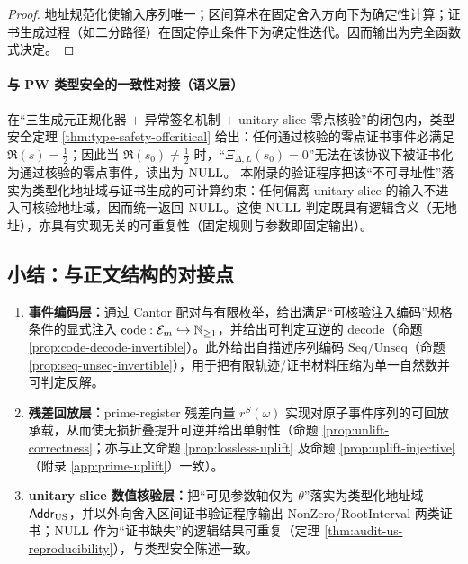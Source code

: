 \begin{proof}
地址规范化使输入序列唯一；区间算术在固定舍入方向下为确定性计算；证书生成过程（如二分路径）在固定停止条件下为确定性迭代。因而输出为完全函数式决定。
\end{proof}

\paragraph{与 PW 类型安全的一致性对接（语义层）}
在“三生成元正规化器 $+$ 异常签名机制 $+$ unitary slice 零点核验”的闭包内，类型安全定理 \ref{thm:type-safety-offcritical} 给出：任何通过核验的零点证书事件必满足 $\Re(s)=\tfrac12$；因此当 $\Re(s_0)\neq \tfrac12$ 时，“$\Xi_{\Delta,L}(s_0)=0$”无法在该协议下被证书化为通过核验的零点事件，读出为 $\mathrm{NULL}$。
本附录的验证程序把该“不可寻址性”落实为类型化地址域与证书生成的可计算约束：任何偏离 unitary slice 的输入不进入可核验地址域，因而统一返回 $\mathrm{NULL}$。这使 $\mathrm{NULL}$ 判定既具有逻辑含义（无地址），亦具有实现无关的可重复性（固定规则与参数即固定输出）。

\subsection{小结：与正文结构的对接点}
\begin{enumerate}
  \item \textbf{事件编码层：}通过 Cantor 配对与有限枚举，给出满足“可核验注入编码”规格条件的显式注入 $\mathrm{code}:\mathcal E_m\hookrightarrow\mathbb{N}_{\ge 1}$，并给出可判定互逆的 $\mathrm{decode}$（命题 \ref{prop:code-decode-invertible}）。此外给出自描述序列编码 $\mathrm{Seq}/\mathrm{Unseq}$（命题 \ref{prop:seq-unseq-invertible}），用于把有限轨迹/证书材料压缩为单一自然数并可判定反解。
  \item \textbf{残差回放层：}prime-register 残差向量 $r^S(\omega)$ 实现对原子事件序列的可回放承载，从而使无损折叠提升可逆并给出单射性（命题 \ref{prop:unlift-correctness}；亦与正文命题 \ref{prop:lossless-uplift} 及命题 \ref{prop:uplift-injective}（附录 \ref{app:prime-uplift}）一致）。
  \item \textbf{unitary slice 数值核验层：}把“可见参数轴仅为 $\theta$”落实为类型化地址域 $\mathsf{Addr}_{\mathrm{US}}$，并以外向舍入区间证书验证程序输出 NonZero/RootInterval 两类证书；$\mathrm{NULL}$ 作为“证书缺失”的逻辑结果可重复（定理 \ref{thm:audit-us-reproducibility}），与类型安全陈述一致。
\end{enumerate}

